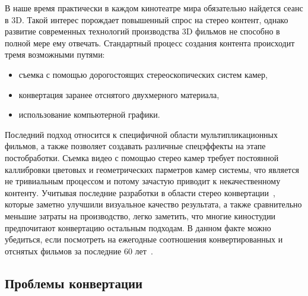 \documentclass[14pt, a4paper]{extarticle}
\begin{document}
В наше время практически в каждом кинотеатре мира обязательно найдется сеанс в 3D. 
Такой интерес порождает повышенный спрос на стерео контент, однако развитие 
современных технологий производства 3D фильмов не способно в полной мере ему отвечать. 
Стандартный процесс создания контента происходит тремя возможными путями: 
\begin{itemize}
	\item съемка с помощью дорогостоящих стереоскопических систем камер,
	\item конвертация заранее отснятого двухмерного материала,
	\item использование компьютерной графики.
\end{itemize}
Последний подход относится к специфичной области мультипликационных фильмов, 
а также позволяет создавать различные спецэффекты на этапе постобработки. 
Съемка видео с помощью стерео камер требует постоянной каллибровки цветовых и 
геометрических парметров камер системы, что является не тривиальным процессом и 
потому зачастую приводит к некачественному контенту.  Учитывая последние разработки 
в области стерео конвертации~\cite{ndjiki2011depth,tolstaya2015depth}, которые 
заметно улучшили визуальное качество результата, а также сравнительно меньшие 
затраты на производство, легко заметить, что многие киностудии предпочитают 
конвертацию остальным подходам. В данном факте можно убедиться, если посмотреть 
на ежегодные соотношения конвертированных и отснятых фильмов за последние 60 лет~\cite{realorfake}.

\subsection{Проблемы конвертации} 
\end{document}
